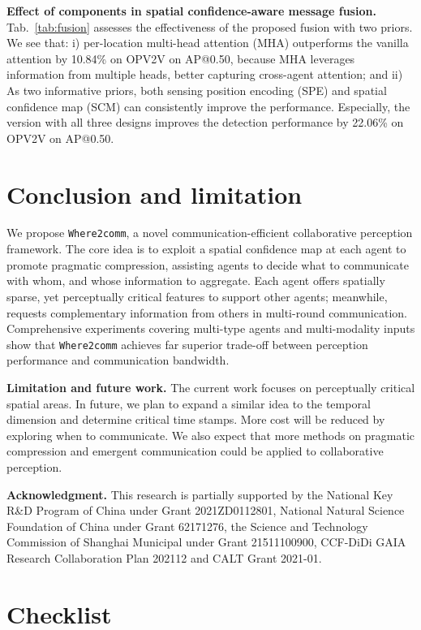 \documentclass{article}
\begin{document}
\textbf{Effect of components in spatial confidence-aware message fusion.} Tab.~\ref{tab:fusion} assesses the effectiveness of the proposed fusion with two priors. We see that: i) per-location multi-head attention (MHA) outperforms the vanilla attention by 10.84\% on OPV2V on AP@0.50, because MHA leverages information from multiple heads, better capturing cross-agent attention; and ii) As two informative priors, both sensing position encoding (SPE) and spatial confidence map (SCM) can consistently improve the performance. Especially, the version with all three designs improves the detection performance by 22.06\% on OPV2V on AP@0.50.
 \vspace{-3mm}
\section{Conclusion and limitation}
\vspace{-3mm}
We propose \texttt{Where2comm}, a novel communication-efficient collaborative perception framework. The core idea is to exploit a spatial confidence map at each agent to promote pragmatic compression, assisting agents to decide what to communicate with whom, and whose information to aggregate. Each agent offers spatially sparse, yet perceptually critical features to support other agents; meanwhile, requests complementary information from others in multi-round communication. Comprehensive experiments covering multi-type agents and multi-modality inputs show that \texttt{Where2comm} achieves far superior trade-off between perception performance and communication bandwidth.

\textbf{Limitation and future work.} 
The current work focuses on perceptually critical spatial areas. In future, we plan to expand a similar idea to the temporal dimension and determine critical time stamps. More cost will be reduced by exploring when to communicate. We also expect that more methods on pragmatic compression and emergent communication could be applied to collaborative perception.

\textbf{Acknowledgment.}
This research is partially supported by the National Key R\&D Program of China under Grant 2021ZD0112801, National Natural Science Foundation of China under Grant 62171276, the Science and Technology Commission of Shanghai Municipal under Grant 21511100900, CCF-DiDi GAIA Research Collaboration Plan 202112 and CALT Grant 2021-01. 
\clearpage
{\small


}
\clearpage
\section*{Checklist}
\end{document}
